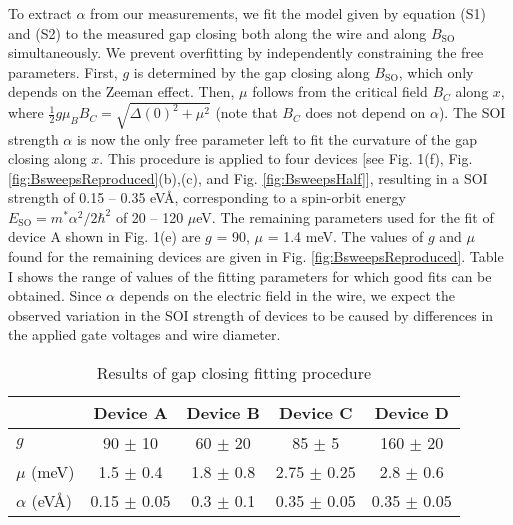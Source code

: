 To extract $\alpha$ from our measurements, we fit the model given by equation (S1) and (S2) to the measured gap closing both along the wire and along $B_{\mathrm{SO}}$ simultaneously. We prevent overfitting by independently constraining the free parameters. First, $g$ is determined by the gap closing along $B_{\mathrm{SO}}$, which only depends on the Zeeman effect. Then, $\mu$ follows from the critical field $B_C$ along $x$, where $\frac{1}{2}g\mu_BB_C = \sqrt{\Delta(0)^2+\mu^2}$ \cite{Lutchyn2010,Oreg2010} (note that $B_C$ does not depend on $\alpha$). The SOI strength $\alpha$ is now the only free parameter left to fit the curvature of the gap closing along $x$. This procedure is applied to four devices [see Fig. 1(f), Fig. \ref{fig:BsweepsReproduced}(b),(c), and Fig. \ref{fig:BsweepsHalf}], resulting in a SOI strength of 0.15 -- 0.35 eV\AA, corresponding to a spin-orbit energy $E_{\mathrm{SO}}=m^*\alpha^2/2\hbar^2$ of 20 -- 120 $\mu$eV. The remaining parameters used for the fit of device A shown in Fig. 1(e) are $g$ = 90, $\mu$ = 1.4 meV. The values of $g$ and $\mu$ found for the remaining devices are given in Fig. \ref{fig:BsweepsReproduced}. Table I shows the range of values of the fitting parameters for which good fits can be obtained. Since $\alpha$ depends on the electric field in the wire, we expect the observed variation in the SOI strength of devices to be caused by differences in the applied gate voltages and wire diameter.

\begin{table}[h]
\label{tab:AlphaFit}
\caption{Results of gap closing fitting procedure}
\begin{tabular}{l|cccc}
& Device A & Device B & Device C & Device D \\
\hline 
$g$ & 90 $\pm$ 10 & 60 $\pm$ 20 & 85 $\pm$ 5 & 160 $\pm$ 20\\
$\mu$ (meV) & 1.5 $\pm$ 0.4 & 1.8 $\pm$ 0.8 & 2.75 $\pm$ 0.25 & 2.8 $\pm$ 0.6\\
$\alpha$ (eV\AA) & 0.15 $\pm$ 0.05 & 0.3 $\pm$ 0.1 & 0.35 $\pm$ 0.05 & 0.35 $\pm$ 0.05\\
\end{tabular}
\end{table}

